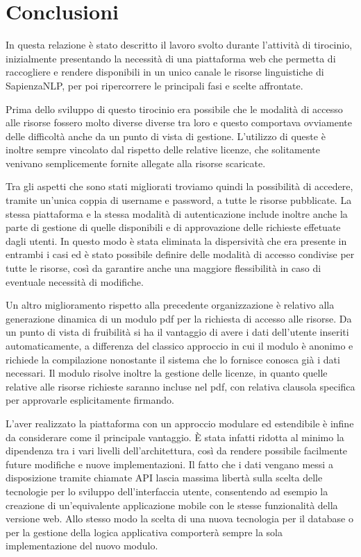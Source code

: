 \chapter{Conclusioni}


In questa relazione è stato descritto il lavoro svolto durante l'attività di
tirocinio, inizialmente presentando la necessità di una piattaforma web che permetta
di raccogliere e rendere disponibili in un unico canale le risorse linguistiche
di SapienzaNLP, per poi ripercorrere le principali fasi e scelte affrontate.

Prima dello sviluppo di questo tirocinio era possibile che le modalità di accesso
alle risorse fossero molto diverse diverse tra loro e questo comportava ovviamente
delle difficoltà anche da un punto di vista di gestione. L'utilizzo di queste
è inoltre sempre vincolato dal rispetto delle relative licenze, che solitamente
venivano semplicemente fornite allegate alla risorse scaricate.

Tra gli aspetti che sono stati migliorati troviamo quindi la possibilità di accedere,
tramite un'unica coppia di username e password, a tutte le risorse pubblicate.
La stessa piattaforma e la stessa modalità di autenticazione include inoltre
anche la parte di gestione di quelle disponibili e di approvazione delle
richieste effetuate dagli utenti. In questo modo è stata eliminata la dispersività
che era presente in entrambi i casi ed è stato possibile definire delle modalità
di accesso condivise per tutte le risorse, così da garantire anche una maggiore
flessibilità in caso di eventuale necessità di modifiche.

Un altro miglioramento rispetto alla precedente organizzazione è relativo alla
generazione dinamica di un modulo pdf per la richiesta di accesso alle risorse.
Da un punto di vista di fruibilità si ha il vantaggio di avere i dati dell'utente
inseriti automaticamente, a differenza del classico approccio in cui il modulo è
anonimo e richiede la compilazione nonostante il sistema che lo fornisce conosca
già i dati necessari.
Il modulo risolve inoltre la gestione delle licenze, in quanto quelle relative
alle risorse richieste saranno incluse nel pdf, con relativa clausola specifica
per approvarle esplicitamente firmando.

L'aver realizzato la piattaforma con un approccio modulare ed estendibile è
infine da considerare come il principale vantaggio. È stata infatti ridotta al
minimo la dipendenza tra i vari livelli dell'architettura, così da rendere
possibile facilmente future modifiche e nuove implementazioni. Il fatto che i dati
vengano messi a disposizione tramite chiamate API lascia massima libertà sulla
scelta delle tecnologie per lo sviluppo dell'interfaccia utente, consentendo ad
esempio la creazione di un'equivalente applicazione mobile con le stesse
funzionalità della versione web.
Allo stesso modo la scelta di una nuova tecnologia per il database o per la gestione
della logica applicativa comporterà sempre la sola implementazione del nuovo
modulo.

